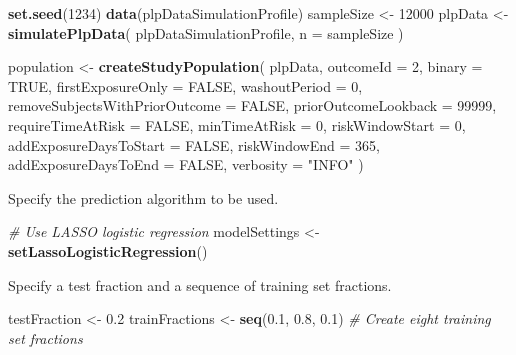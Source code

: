 \documentclass[
]{article}
\newenvironment{Shaded}{\begin{snugshade}}{\end{snugshade}}
\newcommand{\CommentTok}[1]{\textcolor[rgb]{0.56,0.35,0.01}{\textit{#1}}}
\newcommand{\DataTypeTok}[1]{\textcolor[rgb]{0.13,0.29,0.53}{#1}}
\newcommand{\DecValTok}[1]{\textcolor[rgb]{0.00,0.00,0.81}{#1}}
\newcommand{\FloatTok}[1]{\textcolor[rgb]{0.00,0.00,0.81}{#1}}
\newcommand{\KeywordTok}[1]{\textcolor[rgb]{0.13,0.29,0.53}{\textbf{#1}}}
\newcommand{\NormalTok}[1]{#1}
\newcommand{\OtherTok}[1]{\textcolor[rgb]{0.56,0.35,0.01}{#1}}
\newcommand{\StringTok}[1]{\textcolor[rgb]{0.31,0.60,0.02}{#1}}
\begin{document}
\begin{Shaded}
\begin{Highlighting}[]
\KeywordTok{set.seed}\NormalTok{(}\DecValTok{1234}\NormalTok{)}
\KeywordTok{data}\NormalTok{(plpDataSimulationProfile)}
\NormalTok{sampleSize <-}\StringTok{ }\DecValTok{12000}
\NormalTok{plpData <-}\StringTok{ }\KeywordTok{simulatePlpData}\NormalTok{(}
\NormalTok{  plpDataSimulationProfile,}
  \DataTypeTok{n =}\NormalTok{ sampleSize}
\NormalTok{)}

\NormalTok{population <-}\StringTok{ }\KeywordTok{createStudyPopulation}\NormalTok{(}
\NormalTok{  plpData,}
  \DataTypeTok{outcomeId =} \DecValTok{2}\NormalTok{,}
  \DataTypeTok{binary =} \OtherTok{TRUE}\NormalTok{,}
  \DataTypeTok{firstExposureOnly =} \OtherTok{FALSE}\NormalTok{,}
  \DataTypeTok{washoutPeriod =} \DecValTok{0}\NormalTok{,}
  \DataTypeTok{removeSubjectsWithPriorOutcome =} \OtherTok{FALSE}\NormalTok{,}
  \DataTypeTok{priorOutcomeLookback =} \DecValTok{99999}\NormalTok{,}
  \DataTypeTok{requireTimeAtRisk =} \OtherTok{FALSE}\NormalTok{,}
  \DataTypeTok{minTimeAtRisk =} \DecValTok{0}\NormalTok{,}
  \DataTypeTok{riskWindowStart =} \DecValTok{0}\NormalTok{,}
  \DataTypeTok{addExposureDaysToStart =} \OtherTok{FALSE}\NormalTok{,}
  \DataTypeTok{riskWindowEnd =} \DecValTok{365}\NormalTok{,}
  \DataTypeTok{addExposureDaysToEnd =} \OtherTok{FALSE}\NormalTok{,}
  \DataTypeTok{verbosity =} \StringTok{"INFO"}
\NormalTok{)}
\end{Highlighting}
\end{Shaded}

Specify the prediction algorithm to be used.

\begin{Shaded}
\begin{Highlighting}[]
\CommentTok{# Use LASSO logistic regression}
\NormalTok{modelSettings <-}\StringTok{ }\KeywordTok{setLassoLogisticRegression}\NormalTok{()}
\end{Highlighting}
\end{Shaded}

Specify a test fraction and a sequence of training set fractions.

\begin{Shaded}
\begin{Highlighting}[]
\NormalTok{testFraction <-}\StringTok{ }\FloatTok{0.2}
\NormalTok{trainFractions <-}\StringTok{ }\KeywordTok{seq}\NormalTok{(}\FloatTok{0.1}\NormalTok{, }\FloatTok{0.8}\NormalTok{, }\FloatTok{0.1}\NormalTok{) }\CommentTok{# Create eight training set fractions}
\end{Highlighting}
\end{Shaded}
\end{document}
